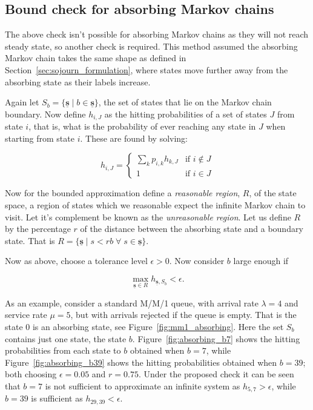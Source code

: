 \documentclass{article}
\begin{document}
\subsection{Bound check for absorbing Markov chains}\label{sec:absorbing_check}
The above check isn't possible for absorbing Markov chains as they will not
reach steady state, so another check is required. This method assumed the
absorbing Markov chain takes the same shape as defined in
Section~\ref{sec:sojourn_formulation}, where states move further away from the
absorbing state as their labels increase.

Again let $S_b = \{\underline{\mathbf{s}} \;|\; b \in \underline{\mathbf{s}}\}$,
the set of states that lie on the Markov chain boundary. Now define $h_{i,J}$ as
the hitting probabilities of a set of states $J$ from state $i$, that is, what
is the probability of ever reaching any state in $J$ when starting from state
$i$. These are found by solving:

\begin{equation}
h_{i, J} = \begin{cases}
\sum_k p_{i, k} h_{k, J} & \text{if } i \notin J \\
1 & \text{if } i \in J
\end{cases}
\end{equation}

Now for the bounded approximation define a \textit{reasonable region}, $R$, of
the state space, a region of states which we reasonable expect the infinite
Markov chain to visit. Let it's complement be known as the \textit{unreasonable
region}.
Let us define $R$ by the percentage $r$ of the distance between the absorbing
state and a boundary state. That is
$R = \{\underline{\mathbf{s}} \;|\; s < rb \;\forall\; s \in \underline{\mathbf{s}}\}$.

Now as above, choose a tolerance level $\epsilon > 0$. Now consider $b$ large
enough if

\begin{equation}
\max_{\underline{\mathbf{s}} \in R} h_{\underline{\mathbf{s}}, S_b} < \epsilon.
\end{equation}

As an example, consider a standard M/M/1 queue, with arrival rate $\lambda = 4$
and service rate $\mu = 5$, but with arrivals rejected if the queue is empty.
That is the state $0$ is an absorbing state, see Figure~\ref{fig:mm1_absorbing}.
Here the set $S_b$ contains just one state, the state $b$.
Figure~\ref{fig:absorbing_b7} shows the hitting probabilities from each state to
$b$ obtained when $b=7$, while Figure~\ref{fig:absorbing_b39} shows the hitting
probabilities obtained when $b=39$; both choosing $\epsilon=0.05$ and $r=0.75$.
Under the proposed check it can be seen that $b=7$ is not sufficient to
approximate an infinite system as $h_{5,7} > \epsilon$, while $b=39$ is
sufficient as $h_{29, 39} < \epsilon$.
\end{document}

